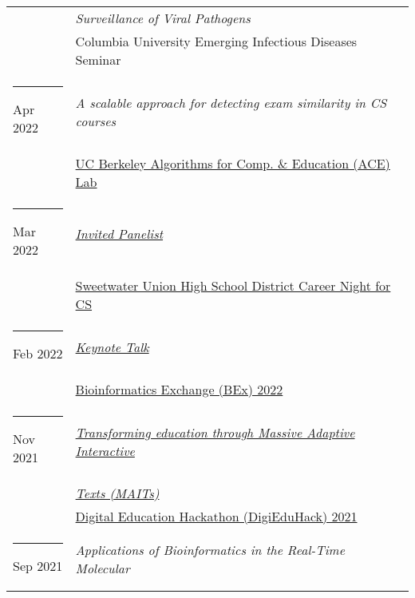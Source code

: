 \documentclass[margin,line]{res}
\begin{document}
\begin{resume}
\begin{longtable}{@{}p{0.7in}p{4in}}
\hspace*{-4mm} & \hspace{4mm} \textit{Surveillance of Viral Pathogens}\\*
\hspace*{-4mm} & \hspace{4mm} Columbia University Emerging Infectious Diseases Seminar\\
\hspace*{-4mm} \rule{-1mm}{5mm} Apr 2022 & \textit{A scalable approach for detecting exam similarity in CS courses}\\*
\hspace*{-4mm} & \hspace{4mm} \href{https://acelab.berkeley.edu/}{UC Berkeley Algorithms for Comp. \& Education (ACE) Lab}\\
\hspace*{-4mm} \rule{-1mm}{5mm} Mar 2022 & \href{http://www.sweetwaterschools.org/}{\textit{Invited Panelist}}\\*
\hspace*{-4mm} & \hspace{4mm} \href{http://www.sweetwaterschools.org/}{Sweetwater Union High School District Career Night for CS}\\
\hspace*{-4mm} \rule{-1mm}{5mm} Feb 2022 & \href{https://bioinformatics.ucsd.edu/node/138}{\textit{Keynote Talk}}\\*
\hspace*{-4mm} & \hspace{4mm} \href{https://bioinformatics.ucsd.edu/node/138}{Bioinformatics Exchange (BEx) 2022}\\
\hspace*{-4mm} \rule{-1mm}{5mm} Nov 2021 & \href{https://www.youtube.com/watch?v=EPU_nv-yb_w&t=8206s}{\textit{Transforming education through Massive Adaptive Interactive}}\\*
\hspace*{-4mm} & \hspace{4mm} \href{https://www.youtube.com/watch?v=EPU_nv-yb_w&t=8206s}{\textit{Texts (MAITs)}}\\*
\hspace*{-4mm} & \hspace{4mm} \href{https://digieduhack.com/}{Digital Education Hackathon (DigiEduHack) 2021}\\
\hspace*{-4mm} \rule{-1mm}{5mm} Sep 2021 & \textit{Applications of Bioinformatics in the Real-Time Molecular}\\*

\end{longtable}
\end{resume}
\end{document}
